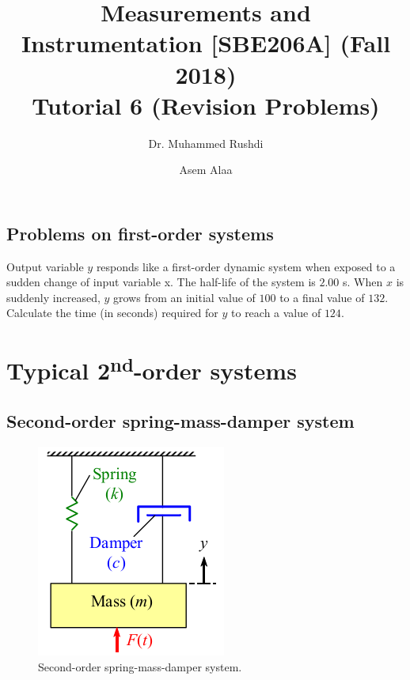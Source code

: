 \documentclass[a4paper,11pt]{book}
\begin{document}
\author{Dr. Muhammed Rushdi \and Asem Alaa}

\title{Measurements and Instrumentation [SBE206A] (Fall 2018)\\ Tutorial 6 (Revision Problems)}

\maketitle


\section*{Problems on first-order systems}


\begin{question}

Output variable $y$ responds like a first-order dynamic system when exposed to a sudden change of input variable x. The half-life of the system is $2.00$ s. When $x$ is suddenly
increased, $y$ grows from an initial value of $100$ to a final value of $132$.
Calculate the time (in seconds) required for $y$ to reach a value of $124$.
\examspace*{10em}

\end{question}
\begin{solution}


\end{solution}

\chapter*{Typical 2\textsuperscript{nd}-order systems}


\section*{Second-order spring-mass-damper system}


\begin{figure}[h!]\label{fig:damper}
\centering
  \includegraphics[width=0.3\linewidth]{damper}
  \caption{Second-order spring-mass-damper system.} 
\end{figure}
\end{document}
